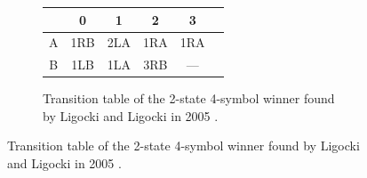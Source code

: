 \documentclass[a4paper,british]{article}
\theoremstyle{definition} %
\numberwithin{equation}{section}
\theoremstyle{definition} %
\newcommand{\stateA}{{\textcolor{colorA}{A}}\xspace}
\newcommand{\stateB}{{\textcolor{colorB}{B}}\xspace}
\begin{document}
\begin{figure}[h!]
    \centering
    \begin{subfigure}[t]{0.45\textwidth}
        \centering
        \renewcommand{\arraystretch}{1.3} %
        \setlength{\tabcolsep}{12pt} %
        \vspace{10pt} %
        \begin{tabular}{cccccc}
            \toprule
                    & \textbf{0} & \textbf{1} & \textbf{2} & \textbf{3} \\
            \midrule
            \stateA & 1R\stateB  & 2L\stateA  & 1R\stateA  & 1R\stateA  \\
            \stateB & 1L\stateB  & 1L\stateA  & 3R\stateB  & ---        \\
            \bottomrule
        \end{tabular}
        \caption{Transition table of the 2-state 4-symbol \BBfull winner found by Ligocki and Ligocki in 2005 \cite{PMichel_website}.}
        \label{table:bb2x4}


\end{subfigure}
\end{figure}
\end{document}
